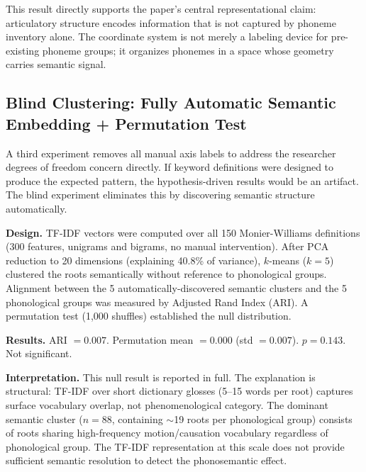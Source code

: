 \documentclass[12pt]{article}
\begin{document}
This result directly supports the paper's central representational claim: articulatory structure encodes information that is not captured by phoneme inventory alone. The coordinate system is not merely a labeling device for pre-existing phoneme groups; it organizes phonemes in a space whose geometry carries semantic signal.

\subsection{Blind Clustering: Fully Automatic Semantic Embedding + Permutation Test}

A third experiment removes all manual axis labels to address the researcher degrees of freedom concern directly. If keyword definitions were designed to produce the expected pattern, the hypothesis-driven results would be an artifact. The blind experiment eliminates this by discovering semantic structure automatically.

\textbf{Design.} TF-IDF vectors were computed over all 150 Monier-Williams definitions (300 features, unigrams and bigrams, no manual intervention). After PCA reduction to 20 dimensions (explaining 40.8\% of variance), $k$-means ($k=5$) clustered the roots semantically without reference to phonological groups. Alignment between the 5 automatically-discovered semantic clusters and the 5 phonological groups was measured by Adjusted Rand Index (ARI). A permutation test (1,000 shuffles) established the null distribution.

\textbf{Results.} ARI $= 0.007$. Permutation mean $= 0.000$ (std $= 0.007$). $p = 0.143$. Not significant.

\textbf{Interpretation.} This null result is reported in full. The explanation is structural: TF-IDF over short dictionary glosses (5--15 words per root) captures surface vocabulary overlap, not phenomenological category. The dominant semantic cluster ($n=88$, containing $\sim$19 roots per phonological group) consists of roots sharing high-frequency motion/causation vocabulary regardless of phonological group. The TF-IDF representation at this scale does not provide sufficient semantic resolution to detect the phonosemantic effect.
\end{document}
